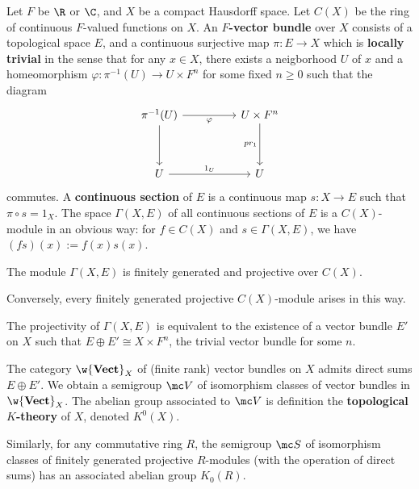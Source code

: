 \begin{defn}
    Let $F$ be $\R$ or $\C$, and $X$ be a compact Hausdorff space. Let $C(X)$ be the ring of continuous $F$-valued functions on $X$. An \textbf{$F$-vector bundle} over $X$ consists of a topological space $E$, and a continuous surjective map $\pi :E \to X$ which is \textbf{locally trivial} in the sense that for any $x \in X$, there exists a neigborhood $U$ of $x$ and a homeomorphism $\varphi :\pi^{-1}(U) \to U \times F^n$ for some fixed $n \geq0$ such that the diagram
    \[\begin{tikzcd}[ampersand replacement=\&]
    	{\pi^{-1}(U)} \&\& {U \times F^n} \\
    	\\
    	U \&\& U
    	\arrow["\varphi"', from=1-1, to=1-3]
    	\arrow[from=1-1, to=3-1]
    	\arrow["{pr_1}"', from=1-3, to=3-3]
    	\arrow["{1_U}", from=3-1, to=3-3]
    \end{tikzcd}\]
    commutes. A \textbf{continuous section} of $E$ is a continuous map $s:X \to E$ such that $\pi \circ s = 1_X$. The space $\Gamma(X,E)$ of all continuous sections of $E$ is a $C(X)$-module in an obvious way: for $f\in C(X)$ and $s \in \Gamma(X,E)$, we have $(fs)(x):=f(x)s(x)$.
\end{defn}

\begin{thm}
    The module $\Gamma(X,E)$ is finitely generated and projective over $C(X)$.

    Conversely, every finitely generated projective $C(X)$-module arises in this way.
\end{thm}

\begin{rmk}
    The projectivity of $\Gamma(X,E)$ is equivalent to the existence of a vector bundle $E'$ on $X$ such that $E \oplus E'\cong X\times F^n$, the trivial vector bundle for some $n$.
\end{rmk}

The category $\w{\textbf{Vect}}_X$ of (finite rank) vector bundles on $X$ admits direct sums $E \oplus E'$. We obtain a semigroup $\mc V$ of isomorphism classes of vector bundles in $\w{\textbf{Vect}}_X$. The abelian group associated to $\mc V$ is definition the \textbf{topological $K$-theory} of $X$, denoted $K^0(X)$.

Similarly, for any commutative ring $R$, the semigroup $\mc S$ of isomorphism classes of finitely generated projective $R$-modules (with the operation of direct sums) has an associated abelian group $K_0(R)$.

